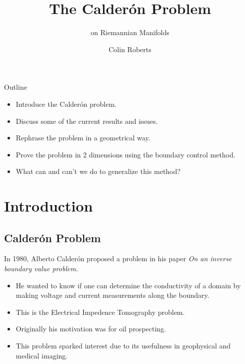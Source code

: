 \documentclass[aspectratio=169]{beamer}
\author{Colin Roberts}
\title{The Calder\'on Problem}
\subtitle{on Riemannian Manifolds}
\begin{document}
\begin{frame}{Outline}
\vfill
    \begin{itemize}
    \pause
        \item Introduce the Calder\'on problem.
        
        \pause
        \item Discuss some of the current results and issues.
        
        \pause
        \item Rephrase the problem in a geometrical way.
        
        \pause
        \item Prove the problem in 2 dimensions using the boundary control method.
        
        \pause
        \item What can and can't we do to generalize this method?
    \end{itemize}
\vfill    
\end{frame}

\section{Introduction}

\subsection{Calder\'on Problem}

\begin{frame}{}
\vfill
In 1980, Alberto Calder\'on proposed a problem in his paper \emph{On an inverse boundary value problem}. 
\pause
    \begin{itemize}
        \item He wanted to know if one can determine the conductivity of a domain by making voltage and current measurements along the boundary.
        
        \pause
        \item This is the Electrical Impedence Tomography problem.
        
        \pause
        \item Originally his motivation was for oil prospecting. 
        
        \pause
        \item This problem sparked interest due to its usefulness in geophysical and medical imaging.
    \end{itemize}
\vfill
\end{frame}
\end{document}
